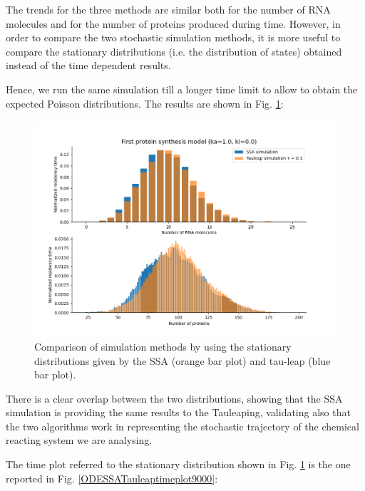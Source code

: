 \documentclass[12pt,a4paper]{report}
\begin{document}
The trends for the three methods are similar both for the number of RNA molecules and for the number of proteins produced during time. However, in order to compare the two stochastic simulation methods, it is more useful to compare the stationary distributions (i.e. the distribution of states) obtained instead of the time dependent results. 

Hence, we run the same simulation till a longer time limit to allow to obtain the expected Poisson distributions. The results are shown in Fig. \ref{SSATauleapdistribution}:

\begin{figure}[!ht]
\centering
\includegraphics[scale=0.70]{RemovingwarmupSSA55.25sTauleap10.22stimelimit9000.png}
\caption{Comparison of simulation methods by using the stationary distributions given by the SSA (orange bar plot) and tau-leap (blue bar plot).}
\label{SSATauleapdistribution}
\end{figure}
\newpage
There is a clear overlap between the two distributions, showing that the SSA simulation is providing the same results to the Tauleaping, validating also that the two algorithms work in representing the stochastic trajectory of the chemical reacting system we are analysing.

The time plot referred to the stationary distribution shown in Fig. \ref{SSATauleapdistribution} is the one reported in Fig. \ref{ODESSATauleaptimeplot9000}: 
\end{document}
